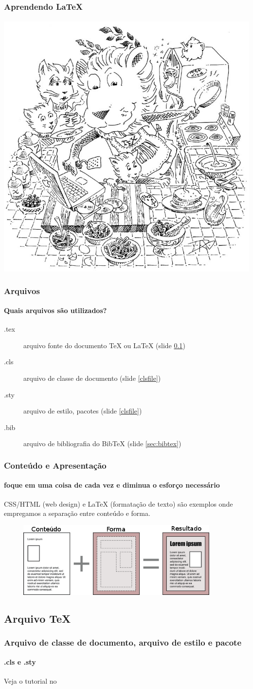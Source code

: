 \begin{frame}
\frametitle{Aprendendo \LaTeX{}}
\framesubtitle{}
\centering
\includegraphics[width=0.5\linewidth]{figures/lion02.png}
\end{frame}

\begin{frame}
\frametitle{Arquivos}
\framesubtitle{Quais arquivos são utilizados?}
\begin{description}
\item[.tex] arquivo fonte do documento \TeX{} ou \LaTeX{} (slide \ref{sec:tex})
\item[.cls] arquivo de classe de documento (slide \ref{clsfile})
\item[.sty] arquivo de estilo, pacotes (slide \ref{clsfile})
\item[.bib] arquivo de bibliografia do BibTeX (slide \ref{sec:bibtex})
\end{description}
\end{frame}

\begin{frame}
\frametitle{Conteúdo e Apresentação}
\framesubtitle{foque em uma coisa de cada vez e diminua o esforço necessário}
  CSS/HTML (web design) e \LaTeX{} (formatação de texto) são exemplos onde empregamos a separação entre conteúdo e forma.
  \begin{figure}[h!]
  \centering
  \includegraphics[width=0.9\textwidth]{figures/content_design.png}
  \label{fig:content_design}
  \end{figure}
\end{frame}


\subsection{Arquivo \TeX{}}\label{sec:tex}


\begin{frame}[label={clsfile}]
\frametitle{Arquivo de classe de documento, arquivo de estilo e pacote}
\framesubtitle{.cls e .sty}
Veja o tutorial no  
\end{frame}
